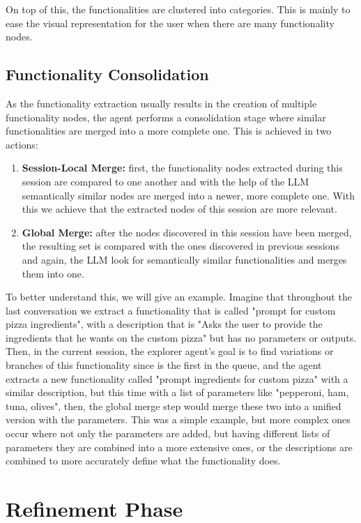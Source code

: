 On top of this,
the functionalities are clustered into categories.
This is mainly to ease the visual representation for the user
when there are many functionality nodes.

\subsection{Functionality Consolidation}


As the functionality extraction usually results
in the creation of multiple functionality nodes,
the agent performs a consolidation stage where
similar functionalities are merged into a more complete one.
This is achieved in two actions:

\begin{enumerate}
  \item \textbf{Session-Local Merge:}
    first, the functionality nodes extracted during this session
    are compared to one another and with the help of the \ac{LLM}
    semantically similar nodes are merged into a newer, more complete one.
    With this we achieve that the extracted nodes of this session are more relevant.

  \item \textbf{Global Merge:}
    after the nodes discovered in this session have been merged,
    the resulting set is compared with the ones discovered in previous sessions
    and again, the \ac{LLM} look for semantically similar functionalities
    and merges them into one.
\end{enumerate}

To better understand this, we will give an example.
Imagine that throughout the last conversation
we extract a functionality that is called
"prompt for custom pizza ingredients",
with a description that is
"Asks the user to provide the ingredients that he wants on the custom pizza"
but has no parameters or outputs.
Then, in the current session,
the explorer agent's goal is
to find variations or branches of this functionality since is the first in the queue,
and the agent extracts a new functionality called
"prompt ingredients for custom pizza"
with a similar description,
but this time with a list of parameters like
"pepperoni, ham, tuna, olives",
then, the global merge step would merge these two
into a unified version with the parameters.
This was a simple example,
but more complex ones occur where
not only the parameters are added,
but having different lists of parameters they are combined into a more extensive ones,
or the descriptions are combined
to more accurately define what the functionality does.



\section{Refinement Phase}\label{sec:refinement}


